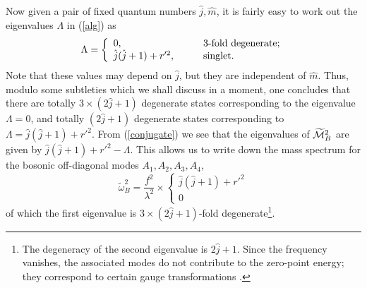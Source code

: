 \documentclass[a4paper,12pt]{article}
\begin{document}
{Now given a pair of fixed quantum numbers $\hat{j}, \hat{m}$, it is fairly easy to work out the eigenvalues $\Lambda$ in (\ref{alg}) as
\begin{equation}
\Lambda = \left\{
                \begin{array}{ll}
                   0, & \hbox{3-fold degenerate;}\\
                   \hat{j}(\hat{j}+1)+r'^{2},  \quad\quad& \hbox{singlet.}
                \end{array}                  
\right.
\label{eigenValue}
\end{equation}
Note that these values may depend on $\hat{j}$, but they are independent of $\hat{m}$. Thus, modulo some subtleties which we shall discuss in a moment, one concludes that there are totally $3\times (2\hat{j}+1)$ degenerate states corresponding to the eigenvalue $\Lambda=0$, and totally $(2\hat{j}+1)$ degenerate states corresponding to $\Lambda=\hat{j}(\hat{j}+1)+r'^{2}$. From (\ref{conjugate}) we see that the eigenvalues of $\widetilde{\cal M}_{B}^{2}$ are given by $\hat{j}(\hat{j}+1)+r'^{2}-\Lambda$. This allows us to write down the mass spectrum for the bosonic off-diagonal modes $A_{1},A_{2},A_{3},A_{4}$,
\begin{equation}
\tilde{\omega}_{B}^{2}=\frac{f^{2}}{\lambda^{2}}\times\left\{
                \begin{array}{ll}
                   \hat{j}(\hat{j}+1)+r'^{2}\\
                    0
                \end{array}                  
\right.
\label{specB2}
\end{equation}
of which the first eigenvalue is $3\times(2\hat{j}+1)$-fold degenerate\footnote{The degeneracy of the second eigenvalue is $2\hat{j}+1$. Since the frequency vanishes, the associated modes do not contribute to the zero-point energy; they correspond to certain gauge transformations \cite{AB}.}.

}
\end{document}
